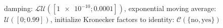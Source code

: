 damping: $\mathcal{LU}([\num[scientific-notation=true]{1e-10}; \num[scientific-notation=true]{0.0001}])$, exponential moving average: $\mathcal{U}([\num[scientific-notation=false]{0}; \num[scientific-notation=true]{0.99}])$, initialize Kronecker factors to identity: $\mathcal{C}(\{\text{no},\text{yes}\})$